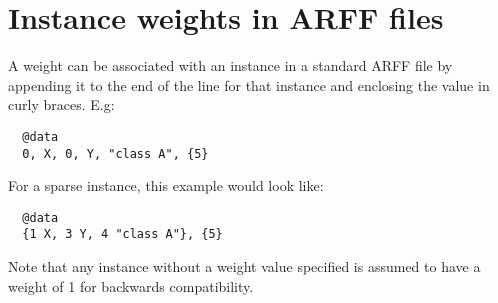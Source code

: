 \section{Instance weights in ARFF files}
A weight can be associated with an instance in a standard ARFF file by appending it to the end of the line for that instance and enclosing the value in curly braces. E.g:

\begin{verbatim}
  @data
  0, X, 0, Y, "class A", {5}
\end{verbatim}

\noindent For a sparse instance, this example would look like:

\begin{verbatim}
  @data
  {1 X, 3 Y, 4 "class A"}, {5}
\end{verbatim}

\noindent Note that any instance without a weight value specified is assumed to have a weight of 1 for backwards compatibility.
